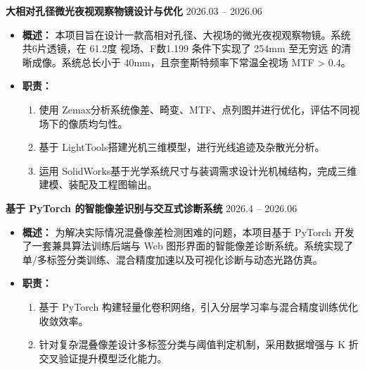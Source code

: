 \documentclass[11pt]{article}
\newlength{\interProjectSpacing}
\newcommand{\projectsep}{\vspace{\interProjectSpacing}}
\newlength{\intraProjectTitleSep}
\newcommand{\titlebreak}{\\[\intraProjectTitleSep]}
\newlength{\intraProjectListTopSep}
\begin{document}
{\large\textbf{大相对孔径微光夜视观察物镜设计与优化} \hfill 2026.03 -- 2026.06}
\begin{itemize}[leftmargin=*, itemsep=0.3em, topsep=\intraProjectListTopSep]
    \item \textbf{概述：} 本项目旨在设计一款高相对孔径、大视场的微光夜视观察物镜。系统共6片透镜，在 61.2度 视场、F数1.199 条件下实现了 254mm 至无穷远 的清晰成像。系统总长小于 40mm，且奈奎斯特频率下常温全视场 MTF > 0.4。
    
    \item \textbf{职责：}
    \begin{enumerate}[label=(\arabic*), leftmargin=1.8em, itemsep=0.2em, topsep=0.2em]
        \item 使用 Zemax分析系统像差、畸变、MTF、点列图并进行优化，评估不同视场下的像质均匀性。
        \item 基于 LightTools搭建光机三维模型，进行光线追迹及杂散光分析。
        \item 运用 SolidWorks基于光学系统尺寸与装调需求设计光机械结构，完成三维建模、装配及工程图输出。
    \end{enumerate}
\end{itemize}

\projectsep

{\large\textbf{基于 PyTorch 的智能像差识别与交互式诊断系统} \hfill 2026.4 -- 2026.06}
\begin{itemize}[leftmargin=*, itemsep=0.3em, topsep=\intraProjectListTopSep]
    \item \textbf{概述：} 为解决实际情况混叠像差检测困难的问题，本项目基于 PyTorch 开发了一套兼具算法训练后端与 Web 图形界面的智能像差诊断系统。系统实现了单/多标签分类训练、混合精度加速以及可视化诊断与动态光路仿真。
    
    \item \textbf{职责：}
    \begin{enumerate}[label=(\arabic*), leftmargin=1.8em, itemsep=0.2em, topsep=0.2em]
        \item 基于 PyTorch 构建轻量化卷积网络，引入分层学习率与混合精度训练优化收敛效率。
        \item 针对复杂混叠像差设计多标签分类与阈值判定机制，采用数据增强与 K 折交叉验证提升模型泛化能力。
    \end{enumerate}
\end{itemize}
\end{document}
